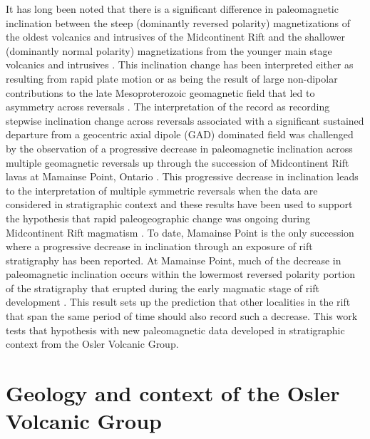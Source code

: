 \documentclass[draft,gc]{AGUTeX}
\begin{document}
\begin{article}
It has long been noted that there is a significant difference in paleomagnetic inclination between the steep (dominantly reversed polarity) magnetizations of the oldest volcanics and intrusives of the Midcontinent Rift and the shallower (dominantly normal polarity) magnetizations from the younger main stage volcanics and intrusives \citep{Halls1982a}. This inclination change has been interpreted either as resulting from rapid plate motion \citep{Robertson1971a, Davis1997a} or as being the result of large non-dipolar contributions to the late Mesoproterozoic geomagnetic field that led to asymmetry across reversals \cite{Pesonen1981a}. The interpretation of the record as recording stepwise inclination change across reversals associated with a significant sustained departure from a geocentric axial dipole (GAD) dominated field was challenged by the observation of a progressive decrease in paleomagnetic inclination across multiple geomagnetic reversals up through the succession of Midcontinent Rift lavas at Mamainse Point, Ontario \citep{Swanson-Hysell2009a, Swanson-Hysell2014a}. This progressive decrease in inclination leads to the interpretation of multiple symmetric reversals when the data are considered in stratigraphic context and these results have been used to support the hypothesis that rapid paleogeographic change was ongoing during Midcontinent Rift magmatism \citep{Buchan2013a, Swanson-Hysell2014a}. To date, Mamainse Point is the only succession where a progressive decrease in inclination through an exposure of rift stratigraphy has been reported. At Mamainse Point, much of the decrease in paleomagnetic inclination occurs within the lowermost reversed polarity portion of the stratigraphy that erupted during the early magmatic stage of rift development \citep{Swanson-Hysell2014a}. This result sets up the prediction that other localities in the rift that span the same period of time should also record such a decrease. This work tests that hypothesis with new paleomagnetic data developed in stratigraphic context from the Osler Volcanic Group. 

\section{Geology and context of the Osler Volcanic Group}

\end{article}
\end{document}

